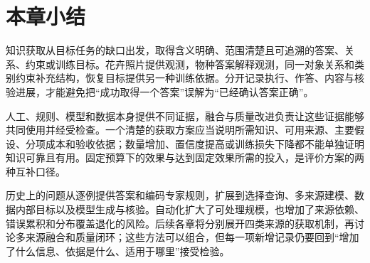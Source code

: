 \section{本章小结}
\label{sec:knowledge-acquisition-summary}

知识获取从目标任务的缺口出发，取得含义明确、范围清楚且可追溯的答案、关系、约束或训练目标。花卉照片提供观测，物种答案解释观测，同一对象关系和类别约束补充结构，恢复目标提供另一种训练依据。分开记录执行、作答、内容与核验进展，才能避免把“成功取得一个答案”误解为“已经确认答案正确”。

人工、规则、模型和数据本身提供不同证据，融合与质量改进负责让这些证据能够共同使用并经受检查。一个清楚的获取方案应当说明所需知识、可用来源、主要假设、分项成本和验收依据；数量增加、置信度提高或训练损失下降都不能单独证明知识可靠且有用。固定预算下的效果与达到固定效果所需的投入，是评价方案的两种互补口径。

历史上的问题从逐例提供答案和编码专家规则，扩展到选择查询、多来源建模、数据内部目标以及模型生成与核验。自动化扩大了可处理规模，也增加了来源依赖、错误累积和分布覆盖退化的风险。后续各章将分别展开四类来源的获取机制，再讨论多来源融合和质量闭环；这些方法可以组合，但每一项新增记录仍要回到“增加了什么信息、依据是什么、适用于哪里”接受检验。
